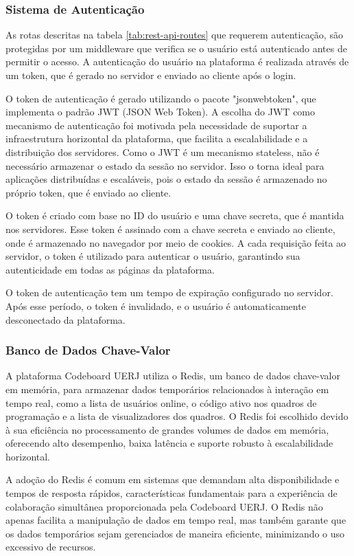 \subsubsection{Sistema de Autenticação}

As rotas descritas na tabela \ref{tab:rest-api-routes} que requerem autenticação, são protegidas por um middleware que verifica se o usuário está autenticado antes de permitir o acesso. A autenticação do usuário na plataforma é realizada através de um token, que é gerado no servidor e enviado ao cliente após o login. 

O token de autenticação é gerado utilizando o pacote "jsonwebtoken", que implementa o padrão JWT (JSON Web Token). A escolha do JWT como mecanismo de autenticação foi motivada pela necessidade de suportar a infraestrutura horizontal da plataforma, que facilita a escalabilidade e a distribuição dos servidores. Como o JWT é um mecanismo stateless, não é necessário armazenar o estado da sessão no servidor. Isso o torna ideal para aplicações distribuídas e escaláveis, pois o estado da sessão é armazenado no próprio token, que é enviado ao cliente.

O token é criado com base no ID do usuário e uma chave secreta, que é mantida nos servidores. Esse token é assinado com a chave secreta e enviado ao cliente, onde é armazenado no navegador por meio de cookies. A cada requisição feita ao servidor, o token é utilizado para autenticar o usuário, garantindo sua autenticidade em todas as páginas da plataforma.

O token de autenticação tem um tempo de expiração configurado no servidor. Após esse período, o token é invalidado, e o usuário é automaticamente desconectado da plataforma.

\subsubsection{Banco de Dados Chave-Valor}

A plataforma Codeboard UERJ utiliza o Redis, um banco de dados chave-valor em memória, para armazenar dados temporários relacionados à interação em tempo real, como a lista de usuários online, o código ativo nos quadros de programação e a lista de visualizadores dos quadros. O Redis foi escolhido devido à sua eficiência no processamento de grandes volumes de dados em memória, oferecendo alto desempenho, baixa latência e suporte robusto à escalabilidade horizontal.

A adoção do Redis é comum em sistemas que demandam alta disponibilidade e tempos de resposta rápidos, características fundamentais para a experiência de colaboração simultânea proporcionada pela Codeboard UERJ. O Redis não apenas facilita a manipulação de dados em tempo real, mas também garante que os dados temporários sejam gerenciados de maneira eficiente, minimizando o uso excessivo de recursos.

